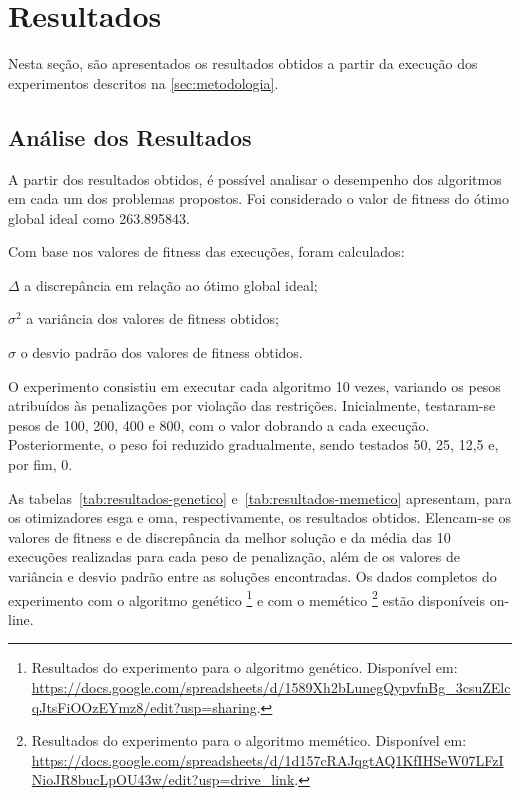 \section{Resultados}%
\label{sec:resultados}

Nesta seção, são apresentados os resultados obtidos a partir da execução dos experimentos descritos na \autoref{sec:metodologia}.

\subsection{Análise dos Resultados}%

A partir dos resultados obtidos, é possível analisar o desempenho dos algoritmos em cada um dos problemas propostos.
Foi considerado o valor de \gls{fitness} do ótimo global ideal como 263.895843.

Com base nos valores de \gls{fitness} das execuções, foram calculados:

\begin{symbols}
    \item[\( \Delta \)] a discrepância em relação ao ótimo global ideal;
    \item[\( \sigma^{2} \)] a variância dos valores de \gls{fitness} obtidos;
    \item[\( \sigma \)] o desvio padrão dos valores de \gls{fitness} obtidos.
\end{symbols}

O experimento consistiu em executar cada algoritmo 10 vezes, variando os pesos atribuídos às penalizações por violação das restrições. Inicialmente, testaram-se pesos de 100, 200, 400 e 800, com o valor dobrando a cada execução. Posteriormente, o peso foi reduzido gradualmente, sendo testados 50, 25, 12,5 e, por fim, 0.

As tabelas~\ref{tab:resultados-genetico} e~\ref{tab:resultados-memetico} apresentam, para os otimizadores \gls{esga} e \gls{oma}, respectivamente, os resultados obtidos.
Elencam-se os valores de \gls{fitness} e de discrepância da melhor solução e da média das 10 execuções realizadas para cada peso de penalização, além de os valores de variância e desvio padrão entre as soluções encontradas.
Os dados completos do experimento com o algoritmo genético%
\footnote{%
    Resultados do experimento para o algoritmo genético. Disponível em: \url{https://docs.google.com/spreadsheets/d/1589Xh2bLunegQypvfnBg_3csuZElcqJtsFiOOzEYmz8/edit?usp=sharing}.
}
e com o memético%
\footnote{%
    Resultados do experimento para o algoritmo memético. Disponível em: \url{https://docs.google.com/spreadsheets/d/1d157cRAJqgtAQ1KfIHSeW07LFzINioJR8bucLpOU43w/edit?usp=drive_link}.
}
estão disponíveis on-line.

